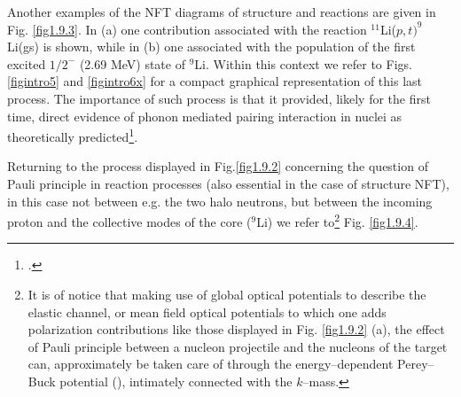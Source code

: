 Another examples of the NFT diagrams of structure and reactions are given in Fig. \ref{fig1.9.3}. In (a) one contribution associated with the reaction $^{11}$Li($p,t)^9$Li(gs) is shown, while in (b) one associated with the population of the first excited $1/2^-$ (2.69 MeV) state of $^9$Li. Within this context we refer to Figs. \ref{figintro5} and \ref{figintro6x}   for a compact graphical representation of this last process. The importance of such process is that it provided, likely for the first time, direct evidence of phonon mediated pairing interaction in nuclei as theoretically predicted\footnote{\cite{Barranco:01} \cite{Tanihata:08,Potel:10,Tanihata:13,Beceiro:15}.}.

          Returning to the process displayed in Fig.\ref{fig1.9.2} concerning the question of Pauli principle in reaction processes (also essential in the case of structure NFT), in this case
          not between e.g. the two halo neutrons, but between the incoming proton and the collective modes
          of the core ($^9$Li) we refer to\footnote{It is of notice that making use of global optical potentials to
                    describe the elastic channel, or mean field optical potentials to which one adds polarization contributions
                    like those displayed in Fig. \ref{fig1.9.2} (a), the effect of Pauli principle between a nucleon projectile and the
                    nucleons of the target can,  approximately be taken care of through the energy--dependent Perey--Buck
                    potential (\cite{Perey:62}), intimately connected with the $k$--mass.} Fig. \ref{fig1.9.4}. 
          
          
